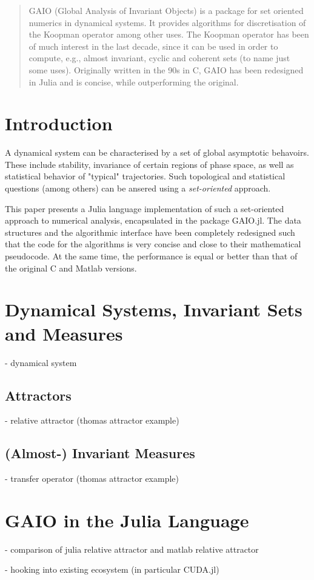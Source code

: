 \documentclass{juliacon}
\begin{document}


\maketitle

\begin{abstract}

GAIO (Global Analysis of Invariant Objects) is a package for set oriented numerics in dynamical systems. It provides algorithms for discretisation of the Koopman operator among other uses. The Koopman operator has been of much interest in the last decade, since it can be used in order to compute, e.g., almost invariant, cyclic and coherent sets (to name just some uses). Originally written in the 90s in C, GAIO has been redesigned in Julia and is concise, while outperforming the original.

\end{abstract}

\section{Introduction}

A dynamical system can be characterised by a set of global asymptotic behavoirs. These include stability, invariance of certain regions of phase space, as well as statistical behavior of "typical" trajectories. Such topological and statistical questions (among others) can be ansered using a \emph{set-oriented} approach. 

This paper presents a Julia language implementation of such a set-oriented approach to numerical analysis, encapsulated in the package GAIO.jl. The data structures and the algorithmic interface have been completely redesigned such that the code for the algorithms is very concise and close to their mathematical pseudocode. At the same time, the performance is equal or better than that of the original C and Matlab versions. 

\section{Dynamical Systems, Invariant Sets and Measures}

- dynamical system

\subsection{Attractors}

- relative attractor (thomas attractor example)

\subsection{(Almost-) Invariant Measures}

- transfer operator (thomas attractor example)

\section{GAIO in the Julia Language}

- comparison of julia relative attractor and matlab relative attractor

- hooking into existing ecosystem (in particular CUDA.jl)


\end{document}
